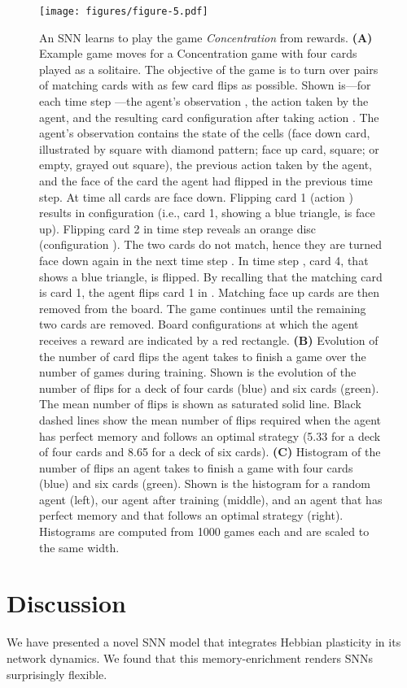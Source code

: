 \documentclass{article}
\begin{document}
\begin{figure}\centering
\texttt{[image: figures/figure-5.pdf]}
\caption{An SNN learns to play the game \emph{Concentration} from rewards.
\textbf{(A)} Example game moves for a Concentration game with four cards played as a solitaire. The objective of the game is to turn over pairs of matching cards with as few card flips as possible.
Shown is---for each time step ---the agent's observation , the action  taken by the agent, and the resulting card configuration  after taking action . The agent's observation  contains the state of the cells (face down card, illustrated by square with diamond pattern; face up card, square; or empty, grayed out square), the previous action taken by the agent, and the face of the card the agent had flipped in the previous time step. At time  all cards are face down.
Flipping card \num{1} (action ) results in configuration  (i.e., card \num{1}, showing a blue triangle, is face up).
Flipping card \num{2} in time step  reveals an orange disc (configuration ). The two cards do not match, hence they are turned face down again in the next time step .
In time step , card \num{4}, that shows a blue triangle, is flipped. By recalling that the matching card is card \num{1}, the agent flips card \num{1} in . Matching face up cards are then removed from the board. The game continues until the remaining two cards are removed. Board configurations at which the agent receives a reward are indicated by a red rectangle.
\textbf{(B)} Evolution of the number of card flips the agent takes to finish a game over the number of games during training. Shown is the evolution of the number of flips for a deck of four cards (blue) and six cards (green). The mean number of flips is shown as saturated solid line. Black dashed lines show the mean number of flips required when the agent has perfect memory and follows an optimal strategy (\num{5.33} for a deck of four cards and \num{8.65} for a deck of six cards).
\textbf{(C)} Histogram of the number of flips an agent takes to finish a game with four cards (blue) and six cards (green). Shown is the histogram for a random agent (left), our agent after training (middle), and an agent that has perfect memory and that follows an optimal strategy (right). Histograms are computed from \num{1000} games each and are scaled to the same width.
}
\label{fig:fig5}
\end{figure}



\section{Discussion}
We have presented a novel SNN model that integrates Hebbian plasticity in its network dynamics. We found that this memory-enrichment renders SNNs surprisingly flexible.
\end{document}
